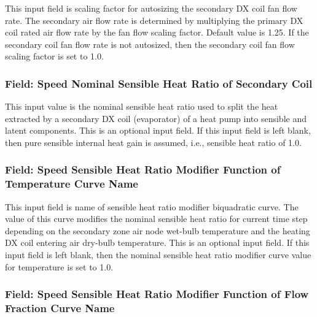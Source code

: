 This input field is scaling factor for autosizing the secondary DX coil fan flow rate. The secondary air flow rate is determined by multiplying the primary DX coil rated air flow rate by the fan flow scaling factor. Default value is 1.25. If the secondary coil fan flow rate is not autosized, then the secondary coil fan flow scaling factor is set to 1.0.

\subsubsection{\texorpdfstring{Field: Speed Nominal Sensible Heat Ratio of Secondary Coil}{Field: Speed  Nominal Sensible Heat Ratio of Secondary Coil}}\label{field-speed-nominal-sensible-heat-ratio-of-secondary-coil}

This input value is the nominal sensible heat ratio used to split the heat extracted by a secondary DX coil (evaporator) of a heat pump into sensible and latent components. This is an optional input field. If this input field is left blank, then pure sensible internal heat gain is assumed, i.e., sensible heat ratio of 1.0.

\subsubsection{\texorpdfstring{Field: Speed Sensible Heat Ratio Modifier Function of Temperature Curve Name}{Field: Speed  Sensible Heat Ratio Modifier Function of Temperature Curve Name}}\label{field-speed-sensible-heat-ratio-modifier-function-of-temperature-curve-name}

This input field is name of sensible heat ratio modifier biquadratic curve. The value of this curve modifies the nominal sensible heat ratio for current time step depending on the secondary zone air node wet-bulb temperature and the heating DX coil entering air dry-bulb temperature. This is an optional input field. If this input field is left blank, then the nominal sensible heat ratio modifier curve value for temperature is set to 1.0.

\subsubsection{\texorpdfstring{Field: Speed Sensible Heat Ratio Modifier Function of Flow Fraction Curve Name}{Field: Speed  Sensible Heat Ratio Modifier Function of Flow Fraction Curve Name}}\label{field-speed-sensible-heat-ratio-modifier-function-of-flow-fraction-curve-name}

